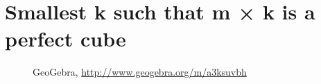 \section{{Smallest k such that m ×  k  is a perfect cube}}
\begin{figure}[H]
\begin{center}
\caption*{GeoGebra, \url{http://www.geogebra.org/m/a3ksuvbh}}
\end{center}
\end{figure}

